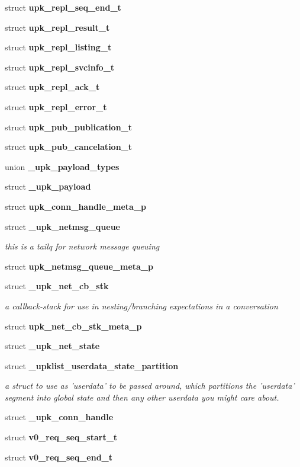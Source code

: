 \begin{DoxyCompactItemize}
struct {\bf upk\_\-repl\_\-seq\_\-end\_\-t}
\item 
struct {\bf upk\_\-repl\_\-result\_\-t}
\item 
struct {\bf upk\_\-repl\_\-listing\_\-t}
\item 
struct {\bf upk\_\-repl\_\-svcinfo\_\-t}
\item 
struct {\bf upk\_\-repl\_\-ack\_\-t}
\item 
struct {\bf upk\_\-repl\_\-error\_\-t}
\item 
struct {\bf upk\_\-pub\_\-publication\_\-t}
\item 
struct {\bf upk\_\-pub\_\-cancelation\_\-t}
\item 
union {\bf \_\-upk\_\-payload\_\-types}
\item 
struct {\bf \_\-upk\_\-payload}
\item 
struct {\bf upk\_\-conn\_\-handle\_\-meta\_\-p}
\item 
struct {\bf \_\-upk\_\-netmsg\_\-queue}
\begin{DoxyCompactList}\small\item\em this is a tailq for network message queuing \end{DoxyCompactList}\item 
struct {\bf upk\_\-netmsg\_\-queue\_\-meta\_\-p}
\item 
struct {\bf \_\-upk\_\-net\_\-cb\_\-stk}
\begin{DoxyCompactList}\small\item\em a callback-\/stack for use in nesting/branching expectations in a conversation \end{DoxyCompactList}\item 
struct {\bf upk\_\-net\_\-cb\_\-stk\_\-meta\_\-p}
\item 
struct {\bf \_\-upk\_\-net\_\-state}
\item 
struct {\bf \_\-upklist\_\-userdata\_\-state\_\-partition}
\begin{DoxyCompactList}\small\item\em a struct to use as 'userdata' to be passed around, which partitions the 'userdata' segment into global state and then any other userdata you might care about. \end{DoxyCompactList}\item 
struct {\bf \_\-upk\_\-conn\_\-handle}
\item 
struct {\bf v0\_\-req\_\-seq\_\-start\_\-t}
\item 
struct {\bf v0\_\-req\_\-seq\_\-end\_\-t}
\item 

\end{DoxyCompactItemize}
